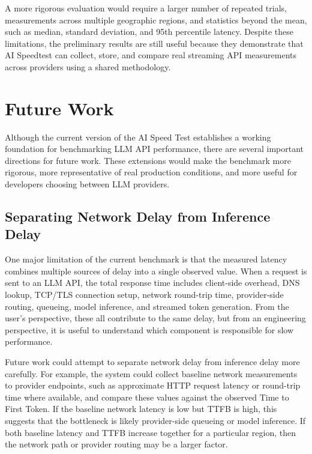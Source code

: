 \documentclass[11pt, a4paper]{article}
\begin{document}
A more rigorous evaluation would require a larger number of repeated trials, measurements across multiple geographic regions, and statistics beyond the mean, such as median, standard deviation, and 95th percentile latency. Despite these limitations, the preliminary results are still useful because they demonstrate that AI Speedtest can collect, store, and compare real streaming API measurements across providers using a shared methodology.

\section{Future Work}

Although the current version of the AI Speed Test establishes a working foundation for benchmarking LLM API performance, there are several important directions for future work. These extensions would make the benchmark more rigorous, more representative of real production conditions, and more useful for developers choosing between LLM providers.

\subsection{Separating Network Delay from Inference Delay}

One major limitation of the current benchmark is that the measured latency combines multiple sources of delay into a single observed value. When a request is sent to an LLM API, the total response time includes client-side overhead, DNS lookup, TCP/TLS connection setup, network round-trip time, provider-side routing, queueing, model inference, and streamed token generation. From the user's perspective, these all contribute to the same delay, but from an engineering perspective, it is useful to understand which component is responsible for slow performance.

Future work could attempt to separate network delay from inference delay more carefully. For example, the system could collect baseline network measurements to provider endpoints, such as approximate HTTP request latency or round-trip time where available, and compare these values against the observed Time to First Token. If the baseline network latency is low but TTFB is high, this suggests that the bottleneck is likely provider-side queueing or model inference. If both baseline latency and TTFB increase together for a particular region, then the network path or provider routing may be a larger factor.
\end{document}
